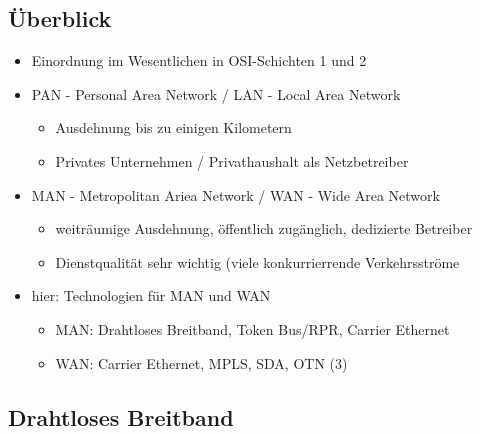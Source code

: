 \subsection{Überblick}
\begin{itemize}
	\item Einordnung im Wesentlichen in OSI-Schichten 1 und 2
	\item PAN - Personal Area Network / LAN - Local Area Network
	\begin{itemize}
		\item Ausdehnung bis zu einigen Kilometern
		\item Privates Unternehmen / Privathaushalt als Netzbetreiber
	\end{itemize}
	\item MAN - Metropolitan Ariea Network / WAN - Wide Area Network
	\begin{itemize}
		\item weiträumige Ausdehnung, öffentlich zugänglich, dedizierte Betreiber
		\item Dienstqualität sehr wichtig (viele konkurrierrende Verkehrsströme
	\end{itemize}
	\item hier: Technologien für MAN und WAN
	\begin{itemize}
		\item MAN: Drahtloses Breitband, Token Bus/RPR, Carrier Ethernet
		\item WAN: Carrier Ethernet, MPLS, SDA, OTN (3)
	\end{itemize}
\end{itemize}
\subsection{Drahtloses Breitband}

